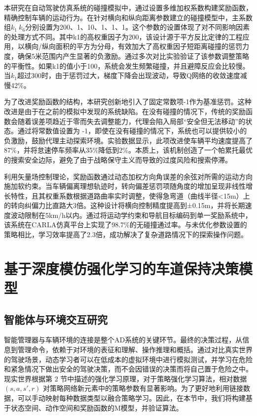 本研究在自动驾驶仿真系统的碰撞模拟中，通过设置多维加权系数构建奖励函数，精确控制车辆的运动行为。在针对横向和纵向距离参数建立的碰撞模型中，主系数组\(k_1~k_6\)分别设置为200、1、10、1、1、1。这个参数的设置体现了对不同影响因素的处理方式不同。其中k1的高权重因子为200，该设计源于平方反比定律的工程应用，以横向/纵向面积的平方为分母，有效加大了高权重因子短距离碰撞的惩罚力度，确保5米范围内产生显著的负激励。通过多次对比实验验证了该参数调整策略的平衡性。如果k1的值小于100，系统会发生频繁碰撞，并且避障反应会比较慢。当\(k_1\)超过300时，由于惩罚过大，梯度下降会出现波动，导致Q网络的收敛速度减慢42\%。

为了改进奖励函数的结构，本研究创新地引入了固定常数项-1作为基准惩罚。这种改进是由于在之前的模拟中发现的系统缺陷。在没有碰撞的情况下，传统的奖励函数会随着误差项趋近于零而失去调整能力，代理会陷入局部“安全但无法移动”的状态。通过将常数值设置为 -1，即使在没有碰撞的情况下，系统也可以提供较小的负激励，鼓励代理主动探索环境。实验数据显示，此项改进使车辆平均速度提高了87\%，并将怠速停车频率从35\%降低到2\%。本质上，该机制创造了一个帕累托最优的搜索安全边际，避免了由于战略保守主义而导致的过度风险和搜索停滞。

利用矢量场控制理论，奖励函数通过动态加权方向角误差的余弦对所需的运动方向施加软约束。当车辆偏离理想轨迹时，转向偏差惩罚项随角度的增加呈现非线性增长特性，且其权重系数根据道路曲率实时调整，使得急弯道（曲线半径<15m）上的转向纠偏力比直路大3倍。这种设计将横向控制精度提高到±0.15m，并将长期速度波动限制在5km/h以内。通过将运动学约束和导航目标编码到单一奖励系统中，该系统在CARLA仿真平台上实现了98.7\%的无碰撞通过率。与未优化参数设置的策略相比，学习效率提高了2.3倍，成功解决了复杂道路情况下的探索操作问题。

\section{基于深度模仿强化学习的车道保持决策模型}

\subsection{智能体与环境交互研究}

智能管理器与车辆环境的连接是整个AD系统的关键环节。最终的决策过程，从信息到管理命令，依赖于对环境的表征和理解、操作推理和概括。通过对比真实世界的驾驶场景，动态学习者可以在低成本的虚拟环境中进行模拟测试，并学习在危险和紧急情况下做出安全的驾驶决策，而不会因错误的决策而将自己置于危险之中。现实世界根据第 2 节中描述的强化学习原理，对于策略强化学习算法，相对数据\((𝑠, 𝑎, 𝑠′, 𝑟)\) 对策略网络新元素中的策略参数有显著影响。为了更好地利用链接数据，可以手动映射每种数据类型以融合策略学习。因此，在本节中，我们将构建基于状态空间、动作空间和奖励函数的M模型，并验证算法。

